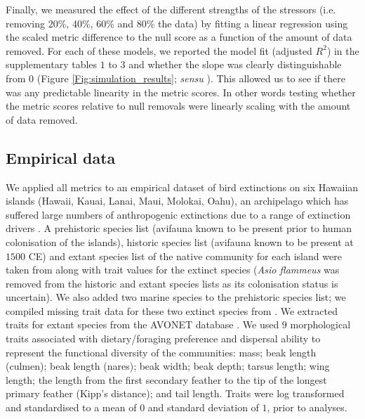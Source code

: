 \documentclass[12pt,letterpaper]{article}
\begin{document}
Finally, we measured the effect of the different strengths of the stressors (i.e. removing 20\%, 40\%, 60\% and 80\% the data) by fitting a linear regression using the scaled metric difference to the null score as a function of the amount of data removed.
For each of these models, we reported the model fit (adjusted $R^2$) in the supplementary tables $1$ to $3$ and whether the slope was clearly distinguishable from $0$ (Figure \ref{Fig:simulation_results}; \textit{sensu} \cite{dushoff2019can}).
This allowed us to see if there was any predictable linearity in the metric scores.
In other words testing whether the metric scores relative to null removals were linearly scaling with the amount of data removed.


\subsection{Empirical data}


We applied all metrics to an empirical dataset of bird extinctions on six Hawaiian islands (Hawaii, Kauai, Lanai, Maui, Molokai, Oahu), an archipelago which has suffered large numbers of anthropogenic extinctions due to a range of extinction drivers \citep{Walther2022}.
A prehistoric species list (avifauna known to be present prior to human colonisation of the islands), historic species list (avifauna known to be present at $1500$ CE) and extant species list of the native community for each island were taken from \cite{matthews2023global} along with trait values for the extinct species (\textit{Asio flammeus} was removed from the historic and extant species lists as its colonisation status is uncertain).
We also added two marine species to the prehistoric species list; we compiled missing trait data for these two extinct species from \cite{sayol2021loss}.
We extracted traits for extant species from the AVONET database \citep{tobias2022avonet}.
We used $9$ morphological traits associated with dietary/foraging preference and dispersal ability \citep{pigot2020macroevolutionary,sheard2020ecological} to represent the functional diversity of the communities: mass; beak length (culmen); beak length (nares); beak width; beak depth; tarsus length; wing length; the length from the first secondary feather to the tip of the longest primary feather (Kipp's distance); and tail length.
Traits were log transformed and standardised to a mean of $0$ and standard deviation of $1$, prior to analyses.
\end{document}
